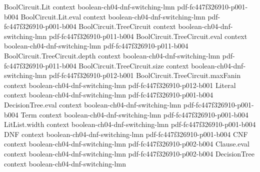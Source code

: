 \begin{lemma}
\label{LMN.circuit_reduction_ind_base}
\leanok
{}
\proofstep
  {BoolCircuit.Lit}
  {context}
  {boolean-ch04-dnf-switching-lmn}
  {pdf-fc447f326910-p001-b004}
\proofstep
  {BoolCircuit.Lit.eval}
  {context}
  {boolean-ch04-dnf-switching-lmn}
  {pdf-fc447f326910-p001-b004}
\proofstep
  {BoolCircuit.TreeCircuit}
  {context}
  {boolean-ch04-dnf-switching-lmn}
  {pdf-fc447f326910-p011-b004}
\proofstep
  {BoolCircuit.TreeCircuit.eval}
  {context}
  {boolean-ch04-dnf-switching-lmn}
  {pdf-fc447f326910-p011-b004}
\proofstep
  {BoolCircuit.TreeCircuit.depth}
  {context}
  {boolean-ch04-dnf-switching-lmn}
  {pdf-fc447f326910-p011-b004}
\proofstep
  {BoolCircuit.TreeCircuit.size}
  {context}
  {boolean-ch04-dnf-switching-lmn}
  {pdf-fc447f326910-p012-b001}
\proofstep
  {BoolCircuit.TreeCircuit.maxFanin}
  {context}
  {boolean-ch04-dnf-switching-lmn}
  {pdf-fc447f326910-p012-b001}
\proofstep
  {Literal}
  {context}
  {boolean-ch04-dnf-switching-lmn}
  {pdf-fc447f326910-p001-b004}
\proofstep
  {DecisionTree.eval}
  {context}
  {boolean-ch04-dnf-switching-lmn}
  {pdf-fc447f326910-p001-b004}
\proofstep
  {Term}
  {context}
  {boolean-ch04-dnf-switching-lmn}
  {pdf-fc447f326910-p001-b004}
\proofstep
  {LitList.width}
  {context}
  {boolean-ch04-dnf-switching-lmn}
  {pdf-fc447f326910-p001-b004}
\proofstep
  {DNF}
  {context}
  {boolean-ch04-dnf-switching-lmn}
  {pdf-fc447f326910-p001-b004}
\proofstep
  {CNF}
  {context}
  {boolean-ch04-dnf-switching-lmn}
  {pdf-fc447f326910-p002-b004}
\proofstep
  {Clause.eval}
  {context}
  {boolean-ch04-dnf-switching-lmn}
  {pdf-fc447f326910-p002-b004}
\proofstep
  {DecisionTree}
  {context}
  {boolean-ch04-dnf-switching-lmn}

\end{lemma}
